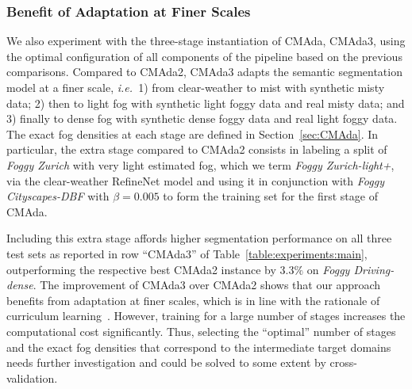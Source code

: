 \documentclass[twocolumn]{svjour3}          \smartqed  \usepackage{graphicx}
\newcommand{\ie}{\mbox{\emph{i.e.\ }}}
\begin{document}
\subsubsection{Benefit of Adaptation at Finer Scales}
\label{sec:benefit:finerscale}

We also experiment with the three-stage instantiation of CMAda, CMAda3, using the optimal configuration of all components of the pipeline based on the previous comparisons. Compared to CMAda2, CMAda3 adapts the semantic segmentation model at a finer scale, \ie{}1) from clear-weather to mist with synthetic misty data; 2) then to light fog with synthetic light foggy data and real misty data; and 3) finally to dense fog with synthetic dense foggy data and real light foggy data. The exact fog densities at each stage are defined in Section~\ref{sec:CMAda}. In particular, the extra stage compared to CMAda2 consists in labeling a split of \emph{Foggy Zurich} with very light estimated fog, which we term \emph{Foggy Zurich-light+}, via the clear-weather RefineNet model and using it in conjunction with \emph{Foggy Cityscapes-DBF} with $\beta=0.005$ to form the training set for the first stage of CMAda.

Including this extra stage affords higher segmentation performance on all three test sets as reported in row ``CMAda3'' of Table~\ref{table:experiments:main}, outperforming the respective best CMAda2 instance by $3.3\%$ on \emph{Foggy Driving-dense}. The improvement of CMAda3 over CMAda2 shows that our approach benefits from adaptation at finer scales, which is in line with the rationale of curriculum learning~\cite{curriculum:learning}. However, training for a large number of stages increases the computational cost significantly. Thus, selecting the ``optimal'' number of stages and the exact fog densities that correspond to the intermediate target domains needs further investigation and could be solved to some extent by cross-validation.
\end{document}
